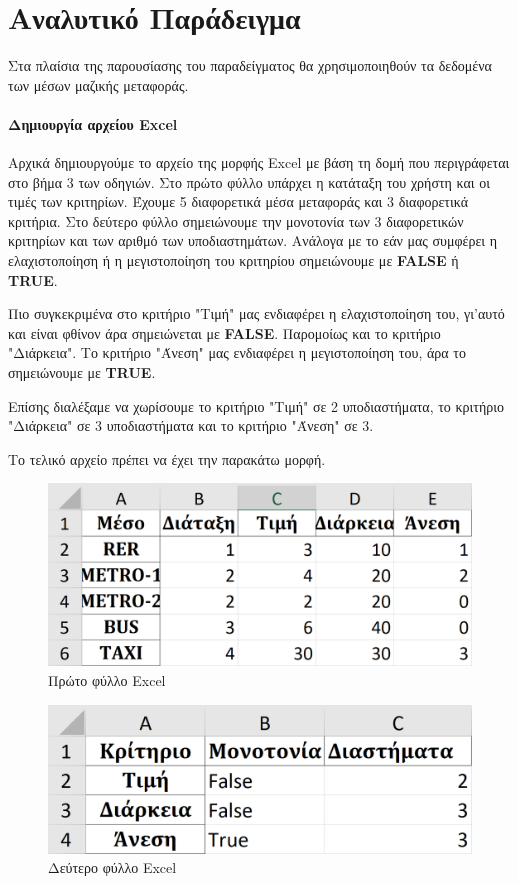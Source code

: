 \documentclass[11pt,a4paper,titlepage]{article}
\numberwithin{equation}{section}
\begin{document}
\section{Αναλυτικό Παράδειγμα}
\label{sec:example}

Στα πλαίσια της παρουσίασης του παραδείγματος θα χρησιμοποιηθούν τα δεδομένα των μέσων μαζικής μεταφοράς.

\paragraph{Δημιουργία αρχείου Excel}
Αρχικά δημιουργούμε το αρχείο της μορφής Excel με βάση τη δομή που περιγράφεται στο βήμα 3 των οδηγιών. Στο πρώτο φύλλο υπάρχει η κατάταξη του χρήστη και οι τιμές των κριτηρίων. Έχουμε 5 διαφορετικά μέσα μεταφοράς και 3 διαφορετικά κριτήρια. Στο δεύτερο φύλλο σημειώνουμε την μονοτονία των 3 διαφορετικών κριτηρίων και των αριθμό των υποδιαστημάτων. Ανάλογα με το εάν μας συμφέρει η ελαχιστοποίηση ή η μεγιστοποίηση του κριτηρίου σημειώνουμε με \textbf{FALSE} ή \textbf{TRUE}.

Πιο συγκεκριμένα στο κριτήριο "Τιμή" μας ενδιαφέρει η ελαχιστοποίηση του, γι'αυτό και είναι φθίνον άρα σημειώνεται με \textbf{FALSE}. Παρομοίως και το κριτήριο "Διάρκεια". Το κριτήριο "Άνεση" μας ενδιαφέρει η μεγιστοποίηση του, άρα το σημειώνουμε με \textbf{TRUE}. 

Επίσης διαλέξαμε να χωρίσουμε το κριτήριο "Τιμή" σε 2 υποδιαστήματα, το κριτήριο "Διάρκεια" σε 3 υποδιαστήματα και το κριτήριο "Άνεση" σε 3.

Το τελικό αρχείο πρέπει να έχει την παρακάτω μορφή.

\begin{figure}[H]
	\centering
	\includegraphics[width=0.7\linewidth]{media/excel_sheet_1.png}
	\caption{Πρώτο φύλλο Excel}
	\label{fig:excel_sheet_1}
\end{figure}

\begin{figure}[H]
	\centering
	\includegraphics[width=0.7\linewidth]{media/excel_sheet_2.png}
	\caption{Δεύτερο φύλλο Excel}
	\label{fig:excel_sheet_2}
\end{figure}
\end{document}
